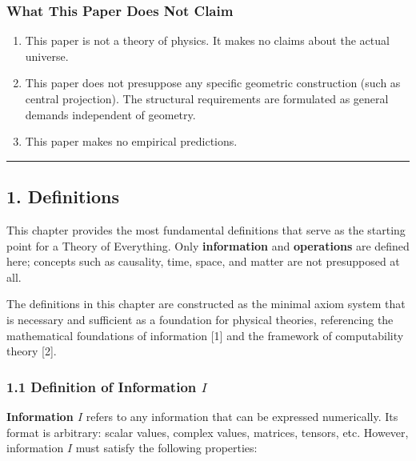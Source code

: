 \documentclass[a4paper,11pt]{article}
\providecommand{\tightlist}{\setlength{\itemsep}{0pt}\setlength{\parskip}{0pt}}
\begin{document}
\subsubsection{What This Paper Does Not
Claim}\label{what-this-paper-does-not-claim}

\begin{enumerate}
\def\labelenumi{\arabic{enumi}.}
\tightlist
\item
  This paper is not a theory of physics. It makes no claims about the
  actual universe.
\item
  This paper does not presuppose any specific geometric construction
  (such as central projection). The structural requirements are
  formulated as general demands independent of geometry.
\item
  This paper makes no empirical predictions.
\end{enumerate}

\begin{center}\rule{0.5\linewidth}{0.5pt}\end{center}

\subsection{1. Definitions}\label{definitions}

This chapter provides the most fundamental definitions that serve as the
starting point for a Theory of Everything. Only \textbf{information} and
\textbf{operations} are defined here; concepts such as causality, time,
space, and matter are not presupposed at all.

The definitions in this chapter are constructed as the minimal axiom
system that is necessary and sufficient as a foundation for physical
theories, referencing the mathematical foundations of information
{[}1{]} and the framework of computability theory {[}2{]}.

\subsubsection{\texorpdfstring{1.1 Definition of Information
\(I\)}{1.1 Definition of Information I}}\label{definition-of-information-i}

\textbf{Information \(I\)} refers to any information that can be
expressed numerically. Its format is arbitrary: scalar values, complex
values, matrices, tensors, etc. However, information \(I\) must satisfy
the following properties:
\end{document}
